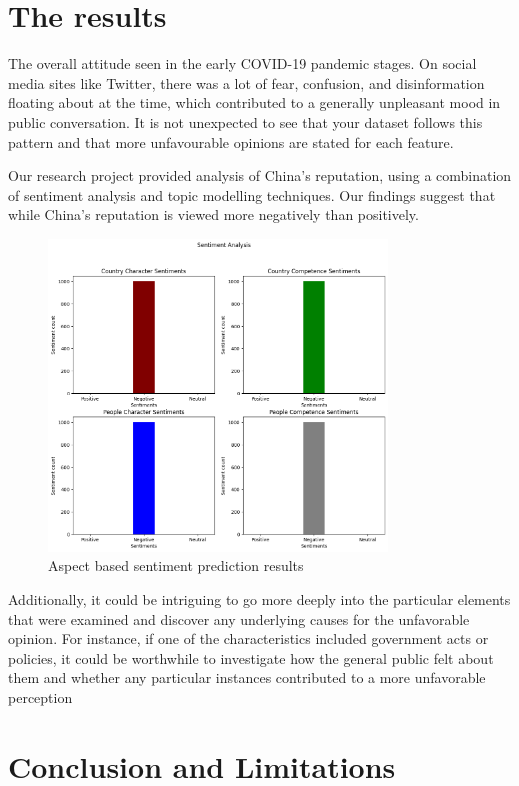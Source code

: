 \documentclass[conference]{IEEEtran}
\begin{document}
\section{The results}
 
The overall attitude seen in the early COVID-19 pandemic stages. On social media sites like Twitter, there was a lot of fear, confusion, and disinformation floating about at the time, which contributed to a generally unpleasant mood in public conversation. It is not unexpected to see that your dataset follows this pattern and that more unfavourable opinions are stated for each feature.

Our research project provided analysis of China's reputation, using a combination of sentiment analysis and topic modelling techniques. Our findings suggest that while China's reputation is viewed more negatively than positively.

\begin{figure}[h]
\centering
 \includegraphics[width=9cm]{results}
 \caption{Aspect based sentiment prediction results}
 \end{figure}

Additionally, it could be intriguing to go more deeply into the particular elements that were examined and discover any underlying causes for the unfavorable opinion. For instance, if one of the characteristics included government acts or policies, it could be worthwhile to investigate how the general public felt about them and whether any particular instances contributed to a more unfavorable perception
 

\section{Conclusion and Limitations}
\end{document}
